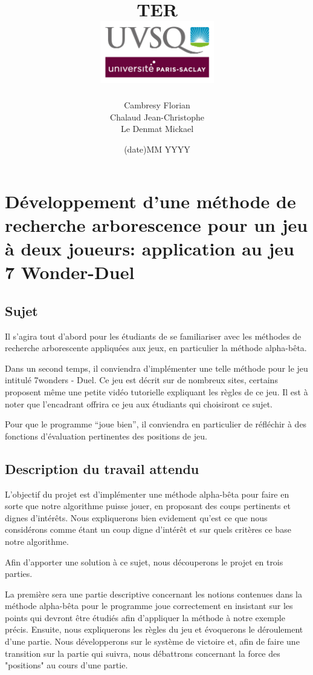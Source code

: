 \documentclass[a4paper, 12pt, french]{article}
\title{TER
\\\includegraphics[width=5cm]{images/uvsqLogo}\\}
\author{Cambresy Florian \\ Chalaud Jean-Christophe \\ Le Denmat Mickael}
\date{(date)MM YYYY}
\begin{document}
	\maketitle
	\renewcommand{\contentsname}{Table des matières}
	\newpage
	\tableofcontents

	\newpage
	\section{Développement d'une méthode de recherche arborescence pour un jeu à deux joueurs: application au jeu 7 Wonder-Duel}
	\subsection{Sujet}
	Il s’agira tout d’abord pour les étudiants de se familiariser avec les méthodes de recherche arborescente
	appliquées aux jeux, en particulier la méthode alpha-bêta.

	Dans un second temps, il conviendra d'implémenter une telle méthode pour le jeu intitulé 7wonders - Duel.
	Ce jeu est décrit sur de nombreux sites, certains proposent même une petite vidéo tutorielle expliquant
	les règles de ce jeu. Il est à noter que l’encadrant offrira ce jeu aux étudiants qui
	choisiront ce sujet.

	Pour que le programme “joue bien”, il conviendra en particulier de réfléchir à des fonctions d'évaluation
	pertinentes des positions de jeu.

	\subsection{Description du travail attendu}
	L'objectif du projet est d'implémenter une méthode alpha-bêta pour faire en sorte que notre algorithme puisse
	jouer, en proposant des coups pertinents et dignes d'intérêts. Nous expliquerons bien evidement qu'est ce que
	nous considérons comme étant un coup digne d'intérêt et sur quels critères ce base notre algorithme.

	Afin d'apporter une solution à ce sujet, nous découperons le projet en trois parties.

	La première sera une partie descriptive concernant les notions contenues dans la méthode alpha-bêta pour
	le programme joue correctement en insistant sur les points qui devront être étudiés afin d'appliquer la méthode
	à notre exemple précis. Ensuite, nous expliquerons les règles du jeu et évoquerons le déroulement d'une partie.
	Nous développerons sur le système de victoire et, afin de faire une transition sur la partie qui suivra, nous
	débattrons concernant la force des "positions" au cours d'une partie.
\end{document}
